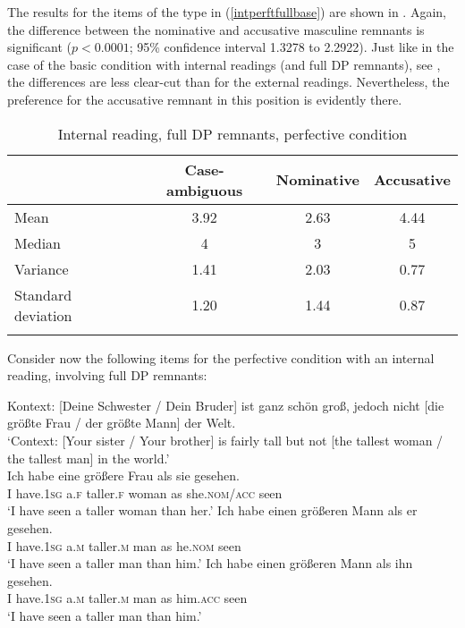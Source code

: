 The results for the items of the type in (\ref{intperftfullbase}) are shown in .
Again, the difference between the nominative and accusative masculine remnants is significant ($p<0.0001$; 95\% confidence interval 1.3278 to 2.2922). Just like in the case of the basic condition with internal readings (and full DP remnants), see , the differences are less clear-cut than for the external readings. Nevertheless, the preference for the accusative remnant in this position is evidently there.

\begin{table}
\begin{tabular}{l *3{S[table-format=1.2]}}
\lsptoprule
{} & {Case-ambiguous} & {Nominative} & {Accusative}\\
\midrule
Mean & 3.92 & 2.63 & 4.44\\
Median & 4 & 3 & 5\\
Variance & 1.41 & 2.03 & 0.77\\
Standard deviation & 1.20 & 1.44 & 0.87\\
\lspbottomrule
\end{tabular}
\caption{Internal reading, full DP remnants, perfective condition}
\label{tableintperftfullbase}
\end{table} 


Consider now the following items for the perfective condition with an internal reading, involving full DP remnants:

\ea Kontext: [Deine Schwester / Dein Bruder] ist ganz schön groß, jedoch nicht [die größte Frau / der größte Mann] der Welt. \label{intperftprobase}\\
`Context: [Your sister / Your brother] is fairly tall but not [the tallest woman / the tallest man] in the world.'\\
\ea \gll Ich habe eine größere Frau als sie gesehen. \label{intperftprobaseambig}\\
I have.\textsc{1sg} a.\textsc{f} taller.\textsc{f} woman as she.\textsc{nom/acc} seen\\
\glt `I have seen a taller woman than her.'
\ex \gll Ich habe einen größeren Mann als er gesehen. \label{intperftprobasenom}\\
I have.\textsc{1sg} a.\textsc{m} taller.\textsc{m} man as he.\textsc{nom} seen\\
\glt `I have seen a taller man than him.'
\ex \gll Ich habe einen größeren Mann als ihn gesehen. \label{intperftprobaseacc}\\
I have.\textsc{1sg} a.\textsc{m} taller.\textsc{m} man as him.\textsc{acc} seen\\
\glt `I have seen a taller man than him.'
\z
\z

